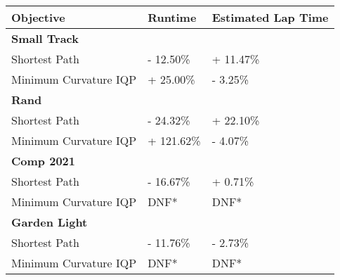 \begin{table}[H]
    \centering
    \begin{tabular}{|lll|}
        \hline
        \multicolumn{1}{|l|}{\textbf{Objective}}    & \multicolumn{1}{l|}{\textbf{Runtime}} & \multicolumn{1}{l|}{\textbf{Estimated Lap Time}} \\ \hline
        \multicolumn{3}{|l|}{\textbf{Small Track}}                                                                                             \\ \hline
        \multicolumn{1}{|l|}{Shortest Path}         & \multicolumn{1}{l|}{- 12.50\%}        & \multicolumn{1}{l|}{+ 11.47\%}                   \\ \hline
        \multicolumn{1}{|l|}{Minimum Curvature IQP} & \multicolumn{1}{l|}{+ 25.00\%}        & \multicolumn{1}{l|}{- 3.25\%}                    \\ \hline
        \multicolumn{3}{|l|}{\textbf{Rand}}                                                                                                    \\ \hline
        \multicolumn{1}{|l|}{Shortest Path}         & \multicolumn{1}{l|}{- 24.32\%}        & \multicolumn{1}{l|}{+ 22.10\%}                   \\ \hline
        \multicolumn{1}{|l|}{Minimum Curvature IQP} & \multicolumn{1}{l|}{+ 121.62\%}       & \multicolumn{1}{l|}{- 4.07\%}                    \\ \hline
        \multicolumn{3}{|l|}{\textbf{Comp 2021}}                                                                                               \\ \hline
        \multicolumn{1}{|l|}{Shortest Path}         & \multicolumn{1}{l|}{- 16.67\%}        & \multicolumn{1}{l|}{+ 0.71\%}                    \\ \hline
        \multicolumn{1}{|l|}{Minimum Curvature IQP} & \multicolumn{1}{l|}{DNF*}             & \multicolumn{1}{l|}{DNF*}                        \\ \hline
        \multicolumn{3}{|l|}{\textbf{Garden Light}}                                                                                            \\ \hline
        \multicolumn{1}{|l|}{Shortest Path}         & \multicolumn{1}{l|}{- 11.76\%}        & \multicolumn{1}{l|}{- 2.73\%}                    \\ \hline
        \multicolumn{1}{|l|}{Minimum Curvature IQP} & \multicolumn{1}{l|}{DNF*}             & \multicolumn{1}{l|}{DNF*}                        \\ \hline

\end{tabular}
\end{table}
